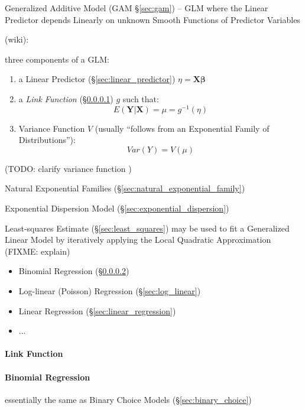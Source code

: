 \fist Generalized Additive Model (GAM \S\ref{sec:gam}) -- GLM where the Linear
Predictor depends Linearly on unknown Smooth Functions of Predictor Variables

(wiki):

three components of a GLM:
\begin{enumerate}
  \item a Linear Predictor (\S\ref{sec:linear_predictor})
    $\eta = \mathbf{X\beta}$
  \item a \emph{Link Function} (\S\ref{sec:link_function}) $g$ such that:
    \[
      E(\mathbf{Y}|\mathbf{X}) = \mu = g^{-1}(\eta)
    \]
  \item Variance Function $V$ (usually ``follows from an Exponential Family of
    Distributions''):
    \[
      Var(Y) = V(\mu)
    \]
\end{enumerate}
(TODO: clarify variance function )

Natural Exponential Families (\S\ref{sec:natural_exponential_family})

Exponential Dispersion Model (\S\ref{sec:exponential_dispersion})

Least-squares Estimate (\S\ref{sec:least_squares}) may be used to fit a
Generalized Linear Model by iteratively applying the Local Quadratic
Approximation (FIXME: explain)

\begin{itemize}
  \item Binomial Regression (\S\ref{sec:binomial_regression})
  \item Log-linear (Poisson) Regression (\S\ref{sec:log_linear})
  \item Linear Regression (\S\ref{sec:linear_regression})
  \item ...
\end{itemize}



\paragraph{Link Function}\label{sec:link_function}\hfill

\paragraph{Binomial Regression}\label{sec:binomial_regression}\hfill

essentially the same as Binary Choice Models (\S\ref{sec:binary_choice})



